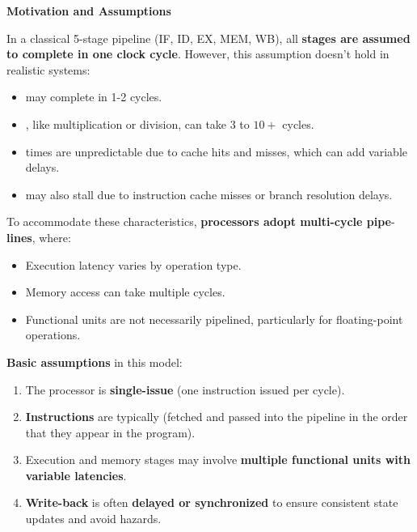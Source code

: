 \highspace
\begin{flushleft}
    \textcolor{Green3}{ \textbf{Motivation and Assumptions}}
\end{flushleft}
In a classical 5-stage pipeline (IF, ID, EX, MEM, WB), all \textbf{stages are assumed to complete in one clock cycle}. However, this assumption doesn't hold in realistic systems:
\begin{itemize}
    \item {} may complete in 1-2 cycles.
    \item {}, like multiplication or division, can take 3 to $10+$ cycles.
    \item {} times are unpredictable due to cache hits and misses, which can add variable delays.
    \item {} may also stall due to instruction cache misses or branch resolution delays.
\end{itemize}
To accommodate these characteristics, \textbf{processors adopt multi-cycle pipe}-\break \textbf{lines}, where:
\begin{itemize}
    \item Execution latency varies by operation type.
    \item Memory access can take multiple cycles.
    \item Functional units are not necessarily pipelined, particularly for floating-point operations.
\end{itemize}
\textbf{Basic assumptions} in this model:
\begin{enumerate}\label{def: in-order issue}
    \item The processor is \textbf{single-issue} (one instruction issued per cycle).
    \item \textbf{Instructions} are typically  (fetched and passed into the pipeline in the order that they appear in the program).
    \item Execution and memory stages may involve \textbf{multiple functional units with variable latencies}.
    \item \textbf{Write-back} is often \textbf{delayed or synchronized} to ensure consistent state updates and avoid hazards.
\end{enumerate}